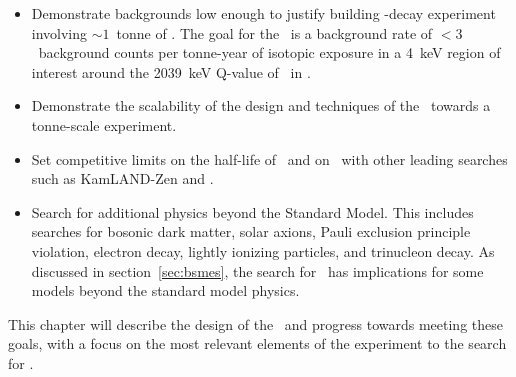 \documentclass[/main.tex]{subfiles}
\begin{document}
\begin{itemize}
\item Demonstrate backgrounds low enough to justify building \bb -decay experiment involving $\sim1$~tonne of . The goal for the \MJD\ is a background rate of $<3$~background counts per tonne-year of isotopic exposure in a 4~keV region of interest around the 2039~keV Q-value of \znbb\ in .
\item Demonstrate the scalability of the design and techniques of the \MJD\ towards a tonne-scale experiment.
\item Set competitive limits on the half-life of \znbb\ and on \mbb\ with other leading searches such as KamLAND-Zen and \Gerda \cite{kamlandzen, gerda}.
\item Search for additional physics beyond the Standard Model. This includes searches for bosonic dark matter, solar axions, Pauli exclusion principle violation, electron decay, lightly ionizing particles, and trinucleon decay\cite{mjdlowE2017, mjdlips2019, mjdtrinuc2019}. As discussed in section~\ref{sec:bsmes}, the search for \bbes\ has implications for some models beyond the standard model physics.
\end{itemize}
This chapter will describe the design of the \MJD\ and progress towards meeting these goals, with a focus on the most relevant elements of the experiment to the search for \bbes.
\end{document}
